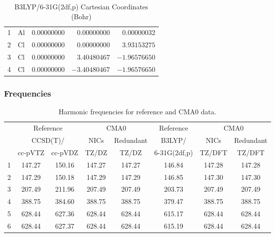 \documentclass[10pt,oneside]{article}
\begin{document}
\begin{table}[h]
\centering
\caption{B3LYP/6-31G(2df,p) Cartesian Coordinates (Bohr)}
\begin{tabular}{llrrr}
\toprule
1  & Al & $ 0.00000000$ & $ 0.00000000$ & $ 0.00000032$ \\
2  & Cl & $ 0.00000000$ & $ 0.00000000$ & $ 3.93153275$ \\
3  & Cl & $ 0.00000000$ & $ 3.40480467$ & $-1.96576650$ \\
4  & Cl & $ 0.00000000$ & $-3.40480467$ & $-1.96576650$ \\
\bottomrule
\end{tabular}
\end{table}

\begin{table}[h!]
\subsubsection*{Frequencies}
\centering
\caption{Harmonic frequencies for reference and CMA0 data.}
\begin{tabular}{cccccccc}
\toprule
{} & \multicolumn{2}{c}{Reference} & \multicolumn{2}{c}{CMA0} &    Reference & \multicolumn{2}{c}{CMA0} \\
{} & \multicolumn{2}{c}{CCSD(T)/} &   NICs &  Redundant &       B3LYP/ &   NICs & Redundant \\
{} &   cc-pVTZ & cc-pVDZ &  TZ/DZ &      TZ/DZ & 6-31G(2df,p) & TZ/DFT &    TZ/DFT \\
\midrule
1 &    147.27 &  150.16 & 147.27 &     147.27 &       146.84 & 147.28 &    147.28 \\
2 &    147.29 &  150.18 & 147.29 &     147.29 &       146.85 & 147.30 &    147.30 \\
3 &    207.49 &  211.96 & 207.49 &     207.49 &       203.73 & 207.49 &    207.49 \\
4 &    388.75 &  384.60 & 388.75 &     388.75 &       379.47 & 388.75 &    388.75 \\
5 &    628.44 &  627.36 & 628.44 &     628.44 &       615.17 & 628.44 &    628.44 \\
6 &    628.44 &  627.37 & 628.44 &     628.44 &       615.19 & 628.44 &    628.44 \\
\bottomrule
\end{tabular}
\end{table}
\end{document}

